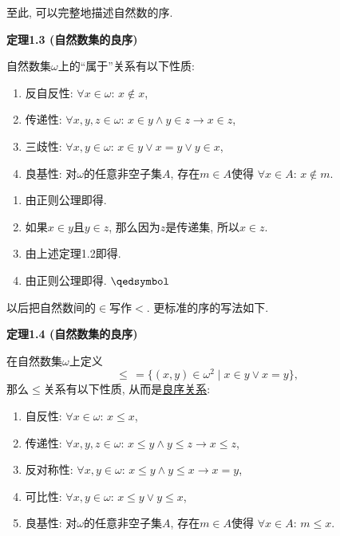 \newpage

至此, 可以完整地描述自然数的序.

\vspace{10pt}

\hypertarget{sec:定理1.3}{}
\noindent\textbf{定理1.3 (自然数集的良序)}

自然数集$\omega$上的``属于''关系有以下性质:
\begin{enumerate}
    \item 反自反性: $\forall x\in\omega:\,x\notin x$,
    \item 传递性: $\forall x,y,z\in\omega:\,x\in y\land y\in z\to x\in z$,
    \item 三歧性: $\forall x,y\in\omega:\,x\in y\lor x=y\lor y\in x$,
    \item 良基性: 对$\omega$的任意非空子集$A$, 存在$m\in A$使得
    $\forall x\in A:\,x\notin m$.
\end{enumerate}


\begin{enumerate}
    \item 由正则公理即得.
    \item 如果$x\in y$且$y\in z$, 那么因为$z$是传递集, 所以$x\in z$.
    \item 由上述定理1.2即得.
    \item 由正则公理即得. \hfill $\qedsymbol$
\end{enumerate}

\vspace{10pt}

以后把自然数间的$\in$写作$<$. 更标准的序的写法如下.

\vspace{10pt}

\hypertarget{sec:定理1.4}{}
\noindent\textbf{定理1.4 (自然数集的良序)}

在自然数集$\omega$上定义
\[
    \leqslant\,=\{(x,y)\in\omega^2\mid x\in y\lor x=y\},
\]
那么$\leqslant$关系有以下性质,
从而是\href{../../04 序理论/01 序关系/04 良序关系#nameddest=sec:定义1.1}{良序关系}:
\begin{enumerate}
    \item 自反性: $\forall x\in\omega:\,x\leqslant x$,
    \item 传递性: $\forall x,y,z\in\omega:\,
    x\leqslant y\land y\leqslant z\to x\leqslant z$,
    \item 反对称性: $\forall x,y\in\omega:\,
    x\leqslant y\land y\leqslant x\to x=y$,
    \item 可比性: $\forall x,y\in\omega:\,x\leqslant y\lor y\leqslant x$,
    \item 良基性: 对$\omega$的任意非空子集$A$, 存在$m\in A$使得
    $\forall x\in A:\,m\leqslant x$.
\end{enumerate}


